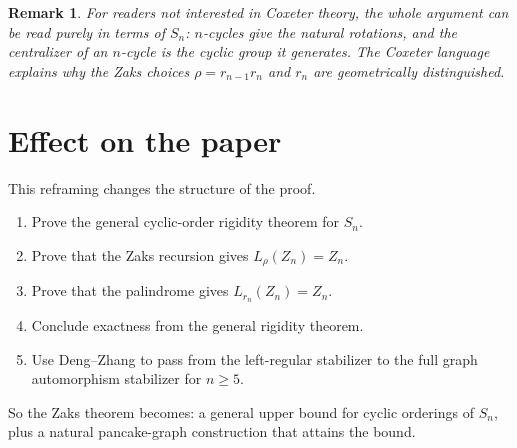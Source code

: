 \documentclass[11pt]{article}
\newtheorem{remark}{Remark}
\begin{document}
\begin{remark}
For readers not interested in Coxeter theory, the whole argument can be read
purely in terms of $S_n$: $n$-cycles give the natural rotations, and the
centralizer of an $n$-cycle is the cyclic group it generates. The Coxeter
language explains why the Zaks choices $\rho=r_{n-1}r_n$ and $r_n$ are
geometrically distinguished.
\end{remark}

\section*{Effect on the paper}

This reframing changes the structure of the proof.

\begin{enumerate}[label=\arabic*.]
  \item Prove the general cyclic-order rigidity theorem for $S_n$.
  \item Prove that the Zaks recursion gives $L_\rho(Z_n)=Z_n$.
  \item Prove that the palindrome gives $L_{r_n}(Z_n)=Z_n$.
  \item Conclude exactness from the general rigidity theorem.
  \item Use Deng--Zhang to pass from the left-regular stabilizer to the full
  graph automorphism stabilizer for $n\geq 5$.
\end{enumerate}

So the Zaks theorem becomes: a general upper bound for cyclic orderings of
$S_n$, plus a natural pancake-graph construction that attains the bound.
\end{document}
